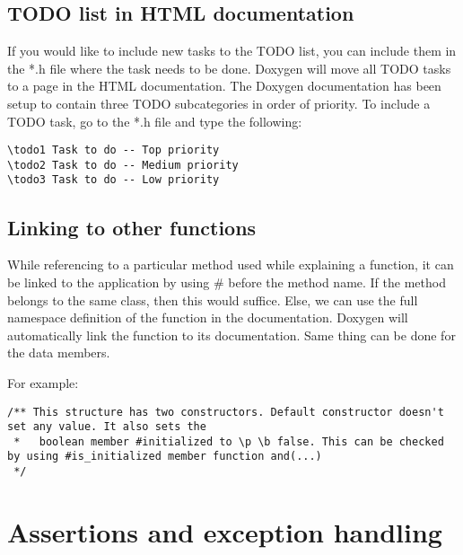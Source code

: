 \subsection{TODO list in HTML documentation}
 If you would like to include new tasks to the TODO list, you can include them in the *.h file where the task needs to be done. Doxygen will move all TODO tasks to a page in the HTML documentation. The Doxygen documentation has been setup to contain three TODO subcategories in order of priority. To include a TODO task, go to the *.h file and type the following:
\begin{lstlisting}
\todo1 Task to do -- Top priority
\todo2 Task to do -- Medium priority
\todo3 Task to do -- Low priority
\end{lstlisting}

\subsection{Linking to other functions}

While referencing to a particular method used while explaining a function, it can be linked to the application by using \# before the method name. If the method belongs to the same class, then this would suffice. Else, we can use the full namespace definition of the function in the documentation. Doxygen will automatically link the function to its documentation. Same thing can be done for the data members.

For example:
\begin{lstlisting}
/** This structure has two constructors. Default constructor doesn't set any value. It also sets the 
 *   boolean member #initialized to \p \b false. This can be checked by using #is_initialized member function and(...)
 */
\end{lstlisting}

\section{Assertions and exception handling}

